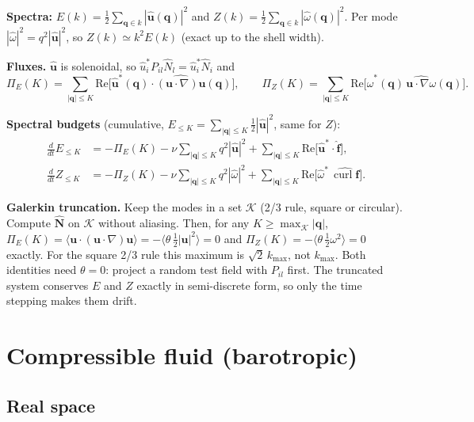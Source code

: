 \documentclass[11pt]{article}
\newcommand{\avg}[1]{\langle #1\rangle}
\newcommand{\curl}{\operatorname{curl}}
\begin{document}
\textbf{Spectra:} $E(k)=\tfrac12\sum_{\bm q\in k}|\hat{\bm u}(\bm q)|^2$ and $Z(k)=\tfrac12\sum_{\bm q\in k}|\hat\omega(\bm q)|^2$.
Per mode $|\hat\omega|^2=q^2|\hat{\bm u}|^2$, so $Z(k)\simeq k^2E(k)$ (exact up to the shell width).

\textbf{Fluxes.} $\hat{\bm u}$ is solenoidal, so $\hat u_i^*P_{il}\hat N_l=\hat u_i^*\hat N_i$ and
\begin{equation}
\Pi_E(K)=\sum_{|\bm q|\le K}\mathrm{Re}\big[\hat{\bm u}^*(\bm q)\cdot\widehat{(\bm u\cdot\nabla)\bm u}(\bm q)\big],\qquad
\Pi_Z(K)=\sum_{|\bm q|\le K}\mathrm{Re}\big[\hat\omega^*(\bm q)\,\widehat{\bm u\cdot\nabla\omega}(\bm q)\big].
\end{equation}

\textbf{Spectral budgets} (cumulative, $E_{\le K}=\sum_{|\bm q|\le K}\tfrac12|\hat{\bm u}|^2$, same for $Z$):
\begin{align}
\frac{d}{dt}E_{\le K}&=-\Pi_E(K)-\nu\sum_{|\bm q|\le K}q^2|\hat{\bm u}|^2+\sum_{|\bm q|\le K}\mathrm{Re}\big[\hat{\bm u}^*\cdot\hat{\bm f}\big],\\
\frac{d}{dt}Z_{\le K}&=-\Pi_Z(K)-\nu\sum_{|\bm q|\le K}q^2|\hat\omega|^2+\sum_{|\bm q|\le K}\mathrm{Re}\big[\hat\omega^*\,\widehat{\curl\bm f}\big].
\end{align}

\textbf{Galerkin truncation.} Keep the modes in a set $\mathcal K$ (2/3 rule, square or circular). Compute $\hat{\bm N}$ on $\mathcal K$ without aliasing.
Then, for any $K\ge\max_{\mathcal K}|\bm q|$, $\Pi_E(K)=\avg{\bm u\cdot(\bm u\cdot\nabla)\bm u}=-\avg{\theta\,\tfrac12|\bm u|^2}=0$ and $\Pi_Z(K)=-\avg{\theta\,\tfrac12\omega^2}=0$ exactly.
For the square 2/3 rule this maximum is $\sqrt2\,k_{\max}$, not $k_{\max}$.
Both identities need $\theta=0$: project a random test field with $P_{il}$ first.
The truncated system conserves $E$ and $Z$ exactly in semi-discrete form, so only the time stepping makes them drift.

\section{Compressible fluid (barotropic)}

\subsection{Real space}
\end{document}
